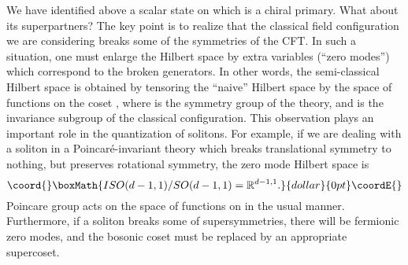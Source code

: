 \documentclass[a4paper,12pt, amsfonts, amssymb]{article}
\providecommand{\RR}{{\mathbb R}}
\renewcommand{\SS}{{\mathbb S}}
\begin{document}
We have identified above a scalar state on \myHighlight{$\SS^2\times \RR$}\coordHE{} which is
a chiral primary. What about its superpartners? The key point is to realize
that the classical field configuration we are considering breaks some
of the symmetries of the CFT. In such a situation, one must enlarge the
Hilbert space by extra variables (``zero modes'') which correspond to
the broken generators. In other words, the semi-classical Hilbert space is
obtained by tensoring the ``naive'' Hilbert space by the space of functions
on the coset \coordHE{}, where \coordHE{} is the symmetry group of the theory, and
\coordHE{} is the invariance subgroup of the classical configuration. This observation
plays an important role in the quantization of solitons. For example, if we
are dealing with a soliton in a Poincar\'{e}-invariant theory which breaks translational symmetry to nothing, but preserves rotational symmetry, the zero
mode Hilbert space is 
$$\coord{}\boxMath{
ISO(d-1,1)/SO(d-1,1)=\RR^{d-1,1}.
}{dollar}{0pt}\coordE{}$$
Poincare group acts on the space of functions on \myHighlight{$\RR^{d-1,1}$}\coordHE{} in the usual
manner. Furthermore, if a soliton breaks some of supersymmetries, there will
be fermionic zero modes, and the bosonic coset must be replaced by an
appropriate supercoset. 
\end{document}

